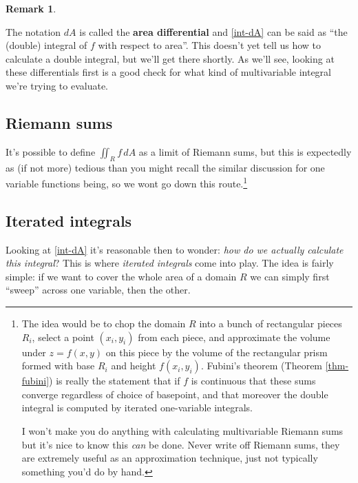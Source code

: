 \documentclass[12pt]{article}
\numberwithin{equation}{subsection}
\numberwithin{figure}{subsection}
\theoremstyle{note}
\newtheorem{remark}[subsection]{Remark}
\begin{document}
{\begin{remark}
\end{remark}

The notation $dA$ is called the \textbf{area differential} and \eqref{int-dA} can be said as ``the (double) integral of $f$ with respect to area''. This doesn't yet tell us how to calculate a double integral, but we'll get there shortly.  As we'll see, looking at these differentials first is a good check for what kind of multivariable integral we're trying to evaluate.

\subsection{Riemann sums}
 It's possible to define $\iint_R f\,dA$ as a limit of Riemann sums, but this is expectedly as (if not more) tedious than you might recall the similar discussion for one variable functions being, so we wont go down this route.\footnote{The idea would be to chop the domain $R$ into a bunch of rectangular pieces $R_i$, select a point $(x_i,y_i)$ from each piece, and approximate the volume under $z=f(x,y)$ on this piece by the volume of the rectangular prism formed with base $R_i$ and height $f(x_i,y_i)$. Fubini's theorem (Theorem \ref{thm-fubini}) is really the statement that if $f$ is continuous that these sums converge regardless of choice of basepoint, and that moreover the double integral is computed by iterated one-variable integrals. 
 
I won't make you do anything with calculating multivariable Riemann sums but it's nice to know this \textit{can} be done. Never write off Riemann sums, they are extremely useful as an approximation technique, just not typically something you'd do by hand.}

\subsection{Iterated integrals}
Looking at \eqref{int-dA} it's reasonable then to wonder: \textit{how do we actually calculate this integral}? This is where \textit{iterated integrals} come into play. The idea is fairly simple: if we want to cover the whole area of a domain $R$ we can simply first ``sweep'' across one variable, then the other.

}
\end{document}
